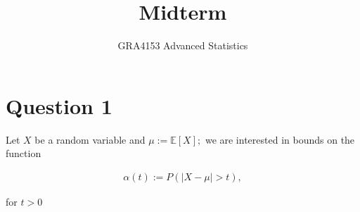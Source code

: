 \documentclass[10pt]{article}
\begin{document}
 
\title{Midterm}
\author{
GRA4153 Advanced Statistics}
\maketitle

\tableofcontents
\newpage

\section{Question 1}

Let $X $ be a random variable and $\mu := \mathbb{E}[X];$ we are interested in bounds on the function

\begin{gather*}
    \alpha(t) := P(|X - \mu| > t),
\end{gather*}

for $t > 0 $
\end{document}
